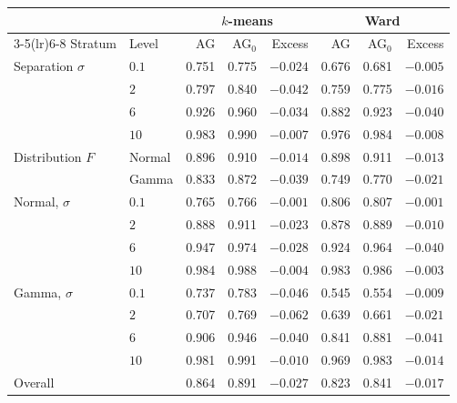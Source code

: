 \begin{tabular}{llrrrrrr}
\toprule
 & & \multicolumn{3}{c}{$k$-means} & \multicolumn{3}{c}{Ward} \\
\cmidrule(lr){3-5}\cmidrule(lr){6-8}
Stratum & Level & AG & AG$_0$ & Excess & AG & AG$_0$ & Excess \\
\midrule
Separation $\sigma$ & $0.1$ & 0.751 & 0.775 & $-0.024$ & 0.676 & 0.681 & $-0.005$ \\
 & $2$ & 0.797 & 0.840 & $-0.042$ & 0.759 & 0.775 & $-0.016$ \\
 & $6$ & 0.926 & 0.960 & $-0.034$ & 0.882 & 0.923 & $-0.040$ \\
 & $10$ & 0.983 & 0.990 & $-0.007$ & 0.976 & 0.984 & $-0.008$ \\
\addlinespace
Distribution $F$ & Normal & 0.896 & 0.910 & $-0.014$ & 0.898 & 0.911 & $-0.013$ \\
 & Gamma & 0.833 & 0.872 & $-0.039$ & 0.749 & 0.770 & $-0.021$ \\
\addlinespace
Normal, $\sigma$ & $0.1$ & 0.765 & 0.766 & $-0.001$ & 0.806 & 0.807 & $-0.001$ \\
 & $2$ & 0.888 & 0.911 & $-0.023$ & 0.878 & 0.889 & $-0.010$ \\
 & $6$ & 0.947 & 0.974 & $-0.028$ & 0.924 & 0.964 & $-0.040$ \\
 & $10$ & 0.984 & 0.988 & $-0.004$ & 0.983 & 0.986 & $-0.003$ \\
\addlinespace
Gamma, $\sigma$ & $0.1$ & 0.737 & 0.783 & $-0.046$ & 0.545 & 0.554 & $-0.009$ \\
 & $2$ & 0.707 & 0.769 & $-0.062$ & 0.639 & 0.661 & $-0.021$ \\
 & $6$ & 0.906 & 0.946 & $-0.040$ & 0.841 & 0.881 & $-0.041$ \\
 & $10$ & 0.981 & 0.991 & $-0.010$ & 0.969 & 0.983 & $-0.014$ \\
\midrule
Overall &  & 0.864 & 0.891 & $-0.027$ & 0.823 & 0.841 & $-0.017$ \\
\bottomrule
\end{tabular}
